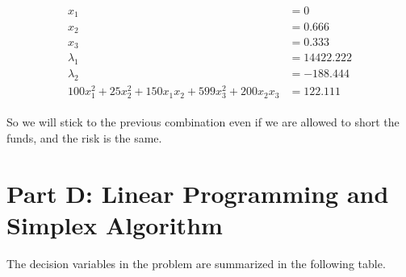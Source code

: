 \documentclass[fleqn,10pt]{wlscirep}
\begin{document}
\begin{align} \begin{split}
    x_{1} &= 0 \\
    x_{2} &= 0.666 \\
    x_{3} &= 0.333 \\
    \lambda_{1} &= 14422.222 \\
    \lambda_{2} &= -188.444 \\
    100 x_{1}^2 + 25 x_{2}^2 + 150 x_{1} x_{2} + 599 x_{3}^2 + 200 x_{2} x_{3} &= 122.111
\end{split} \end{align} 

So we will stick to the previous combination even if we are allowed to short the funds, and the risk is the same.

\section{Part D: Linear Programming and Simplex Algorithm}

The decision variables in the problem are summarized in the following table.
\end{document}
